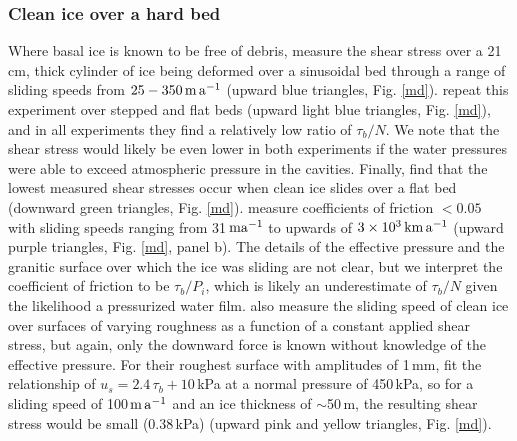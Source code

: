 \documentclass[review]{igs}
\begin{document}
\subsubsection{Clean ice over a hard bed}
Where basal ice is known to be free of debris, \cite{Zoet2015} measure the shear stress over a 21\,cm, thick cylinder of ice being deformed over a sinusoidal bed through a range of sliding speeds from $\rm 25 \--350\,m\,a^{-1}$ (upward blue triangles, Fig. \ref{md}). \cite{Zoet2016} repeat this experiment over stepped and flat beds (upward light blue triangles, Fig. \ref{md}), and in all experiments they find a relatively low ratio of $\tau_b/N$. We note that the shear stress would likely be even lower in both experiments if the water pressures were able to exceed atmospheric pressure in the cavities. Finally,  \cite{Zoet2016} find that the lowest measured shear stresses occur when clean ice slides over a flat bed (downward green triangles, Fig. \ref{md}). \cite{Barnes1971} measure coefficients of friction $<0.05$ with sliding speeds ranging from 31$\rm \,ma^{-1}$ to upwards of $\rm 3\times10^3\,km\,a^{-1}$ (upward purple triangles, Fig. \ref{md}, panel b). The details of the effective pressure and the granitic surface over which the ice was sliding are not clear, but we interpret the coefficient of friction to be $\tau_b/P_i$, which is likely an underestimate of $\tau_b/N$ given the likelihood a pressurized water film. \cite{Budd1979} also measure the sliding speed of clean ice over surfaces of varying roughness as a function of a constant applied shear stress, but again, only the downward force is known without knowledge of the effective pressure. For their roughest surface with amplitudes of 1\,mm, \cite{Budd1979} fit the relationship of $u_s = 2.4\,\tau_b+10$\,kPa at a normal pressure of 450\,kPa, so for a sliding speed of 100\,$\rm m\,a^{-1}$ and an ice thickness of $\sim$50\,m, the resulting shear stress would be small (0.38\,kPa) (upward pink and yellow triangles, Fig. \ref{md}). 
\end{document}
